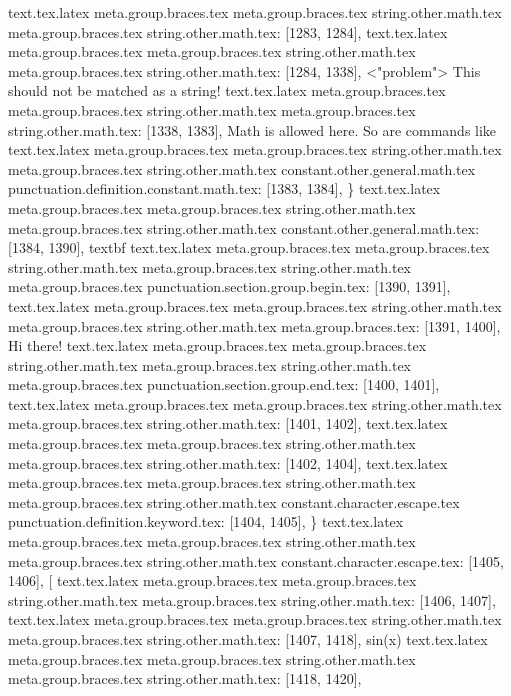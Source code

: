 {{{{{{{{{{{{{{{{{{{{{{{{{{{{{{{{{{text.tex.latex meta.group.braces.tex meta.group.braces.tex string.other.math.tex meta.group.braces.tex string.other.math.tex: [1283, 1284], {
}
text.tex.latex meta.group.braces.tex meta.group.braces.tex string.other.math.tex meta.group.braces.tex string.other.math.tex: [1284, 1338], {  <"problem"> This should not be matched as a string!
}
text.tex.latex meta.group.braces.tex meta.group.braces.tex string.other.math.tex meta.group.braces.tex string.other.math.tex: [1338, 1383], {  Math is allowed here. So are commands like }
text.tex.latex meta.group.braces.tex meta.group.braces.tex string.other.math.tex meta.group.braces.tex string.other.math.tex constant.other.general.math.tex punctuation.definition.constant.math.tex: [1383, 1384], {\}
text.tex.latex meta.group.braces.tex meta.group.braces.tex string.other.math.tex meta.group.braces.tex string.other.math.tex constant.other.general.math.tex: [1384, 1390], {textbf}
text.tex.latex meta.group.braces.tex meta.group.braces.tex string.other.math.tex meta.group.braces.tex string.other.math.tex meta.group.braces.tex punctuation.section.group.begin.tex: [1390, 1391], {{}
text.tex.latex meta.group.braces.tex meta.group.braces.tex string.other.math.tex meta.group.braces.tex string.other.math.tex meta.group.braces.tex: [1391, 1400], {Hi there!}
text.tex.latex meta.group.braces.tex meta.group.braces.tex string.other.math.tex meta.group.braces.tex string.other.math.tex meta.group.braces.tex punctuation.section.group.end.tex: [1400, 1401], {}}
text.tex.latex meta.group.braces.tex meta.group.braces.tex string.other.math.tex meta.group.braces.tex string.other.math.tex: [1401, 1402], {
}
text.tex.latex meta.group.braces.tex meta.group.braces.tex string.other.math.tex meta.group.braces.tex string.other.math.tex: [1402, 1404], {  }
text.tex.latex meta.group.braces.tex meta.group.braces.tex string.other.math.tex meta.group.braces.tex string.other.math.tex constant.character.escape.tex punctuation.definition.keyword.tex: [1404, 1405], {\}
text.tex.latex meta.group.braces.tex meta.group.braces.tex string.other.math.tex meta.group.braces.tex string.other.math.tex constant.character.escape.tex: [1405, 1406], {[}
text.tex.latex meta.group.braces.tex meta.group.braces.tex string.other.math.tex meta.group.braces.tex string.other.math.tex: [1406, 1407], {
}
text.tex.latex meta.group.braces.tex meta.group.braces.tex string.other.math.tex meta.group.braces.tex string.other.math.tex: [1407, 1418], {    sin(x)
}
text.tex.latex meta.group.braces.tex meta.group.braces.tex string.other.math.tex meta.group.braces.tex string.other.math.tex: [1418, 1420], {  }
}}}}}}}}}}}}}}}}}}}}}}}}}}}}}}}}}}}}
